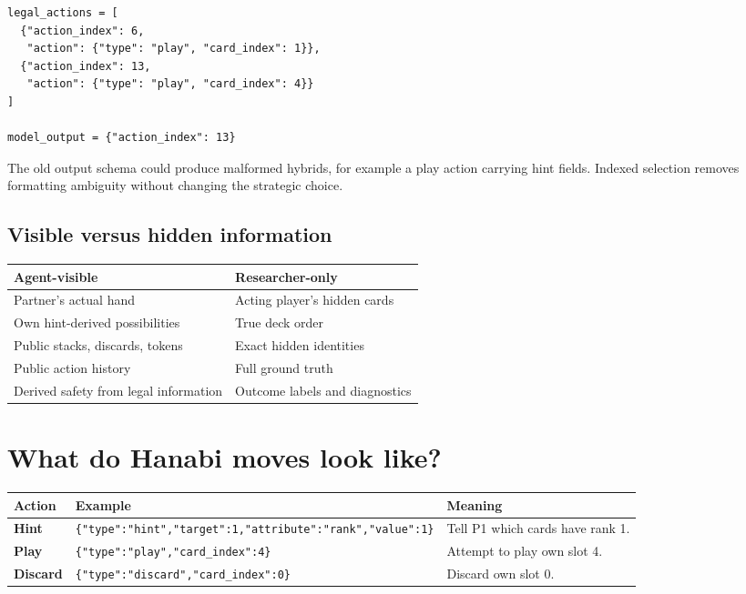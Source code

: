 \documentclass[11pt,a4paper]{article}
\begin{document}
\begin{lstlisting}
legal_actions = [
  {"action_index": 6,
   "action": {"type": "play", "card_index": 1}},
  {"action_index": 13,
   "action": {"type": "play", "card_index": 4}}
]

model_output = {"action_index": 13}
\end{lstlisting}

\begin{callout}
The old output schema could produce malformed hybrids, for example a play action carrying hint fields. Indexed selection removes formatting ambiguity without changing the strategic choice.
\end{callout}

\subsection{Visible versus hidden information}

\begin{table}[H]
\centering
\small
\begin{tabularx}{\textwidth}{YY}
\toprule
\textbf{Agent-visible} & \textbf{Researcher-only} \\
\midrule
Partner's actual hand & Acting player's hidden cards \\
Own hint-derived possibilities & True deck order \\
Public stacks, discards, tokens & Exact hidden identities \\
Public action history & Full ground truth \\
Derived safety from legal information & Outcome labels and diagnostics \\
\bottomrule
\end{tabularx}
\end{table}

\section{What do Hanabi moves look like?}

\begin{table}[H]
\centering
\small
\begin{tabularx}{\textwidth}{>{\bfseries}p{20mm}p{78mm}Y}
\toprule
Action & Example & Meaning \\
\midrule
Hint & \texttt{\{"type":"hint","target":1,"attribute":"rank","value":1\}} & Tell P1 which cards have rank 1. \\
Play & \texttt{\{"type":"play","card\_index":4\}} & Attempt to play own slot 4. \\
Discard & \texttt{\{"type":"discard","card\_index":0\}} & Discard own slot 0. \\
\bottomrule
\end{tabularx}
\end{table}
\end{document}
